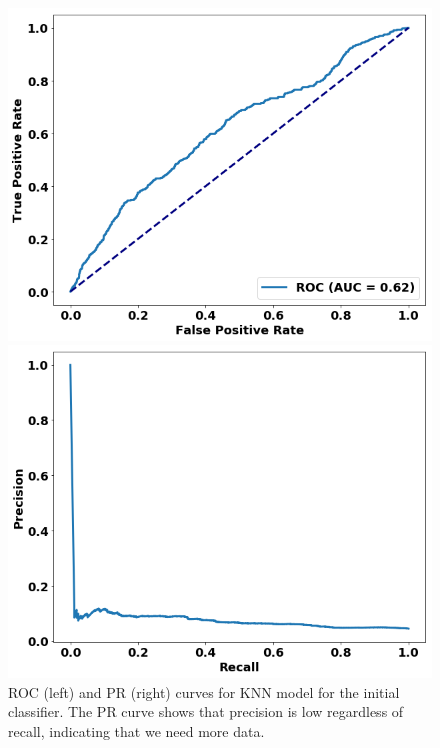 \begin{figure}
\centering
\begin{minipage}[b]{.36\textwidth}
\includegraphics[trim=0in 0.1in 0.1in 0.in,clip,width=1.0\textwidth]{figures/roc_init.png}
\end{minipage}\qquad
\hspace{2ex}
\begin{minipage}[b]{.36\textwidth}
\includegraphics[trim=0in 0.1in 0.1in 0.in,clip,width=1.0\textwidth]{figures/prc_init.png}
\end{minipage}
\caption{ROC (left) and PR (right) curves for KNN model for the initial classifier. 
The PR curve shows that precision is low regardless of recall, 
indicating that we need more data.\label{fig:knn_init}}
\end{figure}

